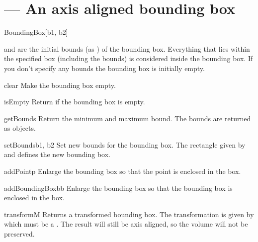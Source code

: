 
\section{ ---
         An axis aligned bounding box}

\begin{classdesc}{BoundingBox}{[b1, b2]}

 and  are the initial bounds (as ) of 
the bounding box.
Everything that lies within the specified box (including the bounds)
is considered inside the bounding box. If you don't specify any bounds
the bounding box is initially empty.
\end{classdesc}


\begin{methoddesc}{clear}{}
Make the bounding box empty.
\end{methoddesc}

\begin{methoddesc}{isEmpty}{}
Return  if the bounding box is empty.
\end{methoddesc}

\begin{methoddesc}{getBounds}{}
Return the minimum and maximum bound. The bounds are returned as
 objects.
\end{methoddesc}

\begin{methoddesc}{setBounds}{b1, b2}
Set new bounds for the bounding box. The rectangle given
by  and  defines the new bounding box.
\end{methoddesc}

\begin{methoddesc}{addPoint}{p}
Enlarge the bounding box so that the point  is enclosed in the box.
\end{methoddesc}

\begin{methoddesc}{addBoundingBox}{bb}
Enlarge the bounding box so that the bounding box  is enclosed in
the box.
\end{methoddesc}

\begin{methoddesc}{transform}{M}
Returns a transformed bounding box. The transformation is given by 
which must be a . The result will still be axis aligned, so the
volume will not be preserved.
\end{methoddesc}
